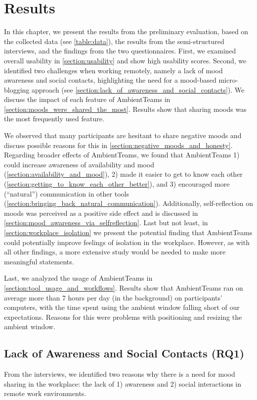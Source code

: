 \chapter{Results}
\label{chapter:results}

In this chapter, we present the results from the preliminary evaluation, based on the collected data (see \autoref{table:data}), the results from the semi-structured interviews, and the findings from the two questionnaires. First, we examined overall usability in \autoref{section:usability} and show high usability scores. Second, we identified two challenges when working remotely, namely a lack of mood awareness and social contacts, highlighting the need for a mood-based micro-blogging approach (see \autoref{section:lack_of_awareness_and_social_contacts}). We discuss the impact of each feature of AmbientTeams in \autoref{section:moods_were_shared_the_most}. Results show that sharing moods was the most frequently used feature. 

We observed that many participants are hesitant to share negative moods and discuss possible reasons for this in \autoref{section:negative_moods_and_honesty}. Regarding broader effects of AmbientTeams, we found that AmbientTeams 1) could increase awareness of availability and mood (\autoref{section:availability_and_mood}), 2) made it easier to get to know each other (\autoref{section:getting_to_know_each_other_better}), and 3) encouraged more (\enquote{natural}) communication in other tools (\autoref{section:bringing_back_natural_communication}). Additionally, self-reflection on moods was perceived as a positive side effect and is discussed in \autoref{section:mood_awareness_via_selfreflection}. Last but not least, in \autoref{section:workplace_isolation} we present the potential finding that AmbientTeams could potentially improve feelings of isolation in the workplace. However, as with all other findings, a more extensive study would be needed to make more meaningful statements.

Last, we analyzed the usage of AmbientTeams in \autoref{section:tool_usage_and_workflows}. Results show that AmbientTeams ran on average more than 7 hours per day (in the background) on participants' computers, with the time spent using the ambient window falling short of our expectations. Reasons for this were problems with positioning and resizing the ambient window.

\section{Lack of Awareness and Social Contacts (RQ1)}
\label{section:lack_of_awareness_and_social_contacts}
From the interviews, we identified two reasons why there is a need for mood sharing in the workplace: the lack of 1) awareness and 2) social interactions in remote work environments.

